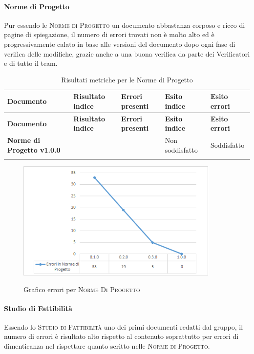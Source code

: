 \documentclass[../piano-di-qualifica.tex]{subfiles}
\begin{document}
\paragraph{Norme di Progetto}
\label{sub:norme_di_progetto}
Pur essendo le \textsc{Norme di Progetto} un documento abbastanza corposo e ricco di pagine di spiegazione, il numero di errori trovati non è molto alto ed è progressivamente calato in base alle versioni del documento dopo ogni fase di verifica delle modifiche, grazie anche a una buona verifica da parte dei Verificatori e di tutto il team.

\renewcommand{\arraystretch}{2} %
\begin{longtable}[H]{>{\centering\bfseries}m{6cm} >{\centering}m{2cm} >{\centering}m{2.5cm} >{\centering}m{2.5cm} >{\centering\arraybackslash}m{2.5cm}}  
  \rowcolor{lightgray}
  {\textbf{Documento}} & {\textbf{Risultato indice}} & {\textbf{Errori presenti}} & {\textbf{Esito indice}} & {\textbf{Esito errori}}  \\
  \endfirsthead%
  \rowcolor{lightgray}
  {\textbf{Documento}} & {\textbf{Risultato indice}} & {\textbf{Errori presenti}} & {\textbf{Esito indice}} & {\textbf{Esito errori}}  \\
  \endhead%
  \textbf{Norme di Progetto v1.0.0} &                  & 0               & Non soddisfatto & Soddisfatto \\
  \caption{Risultati metriche per le Norme di Progetto}
  \label{tab:my-table}
\end{longtable}

    \begin{figure}[H]
        \centering
        \includegraphics[width=10cm]{img/erroriNorme.png}
        \label{fig:scice_documenti}
        \caption{Grafico errori per \textsc{Norme Di Progetto}}
    \end{figure}

\paragraph{Studio di Fattibilità}
\label{sub:studio_di_fattibilita}
Essendo lo \textsc{Studio di Fattibilità} uno dei primi documenti redatti dal gruppo, il numero di errori è risultato alto rispetto al contenuto soprattutto per errori di dimenticanza nel rispettare quanto scritto nelle \textsc{Norme di Progetto}.
\end{document}
